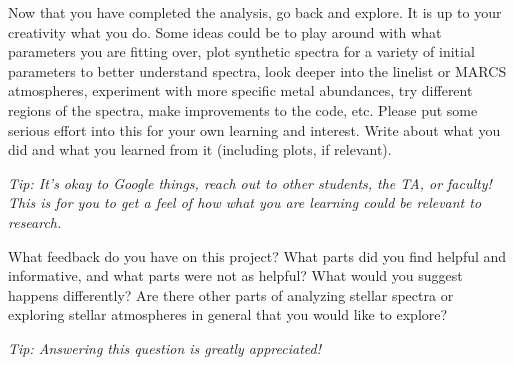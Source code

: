 \documentclass[12pt]{article}
\newenvironment{question}[1]
  {\par\noindent\textbf{#1}\par\vspace{0.5em}}
  {\vspace{1em}}
\newenvironment{answer}
  {\par\noindent\par\vspace{0.5em}\noindent\ignorespaces}
  {\vspace{1em}}
\begin{document}
\begin{question}{}
    Now that you have completed the analysis, go back and explore. It is up to your creativity what you do. Some ideas could be to play around with what parameters you are fitting over, plot synthetic spectra for a variety of initial parameters to better understand spectra, look deeper into the linelist or MARCS atmospheres, experiment with more specific metal abundances, try different regions of the spectra, make improvements to the code, etc. Please put some serious effort into this for your own learning and interest. Write about what you did and what you learned from it (including plots, if relevant).

    \textit{Tip: It's okay to Google things, reach out to other students, the TA, or faculty! This is for you to get a feel of how what you are learning could be relevant to research.}
\end{question}

\begin{answer}
\end{answer}

\vspace{10em}

\begin{question}{}
    What feedback do you have on this project? What parts did you find helpful and informative, and what parts were not as helpful? What would you suggest happens differently? Are there other parts of analyzing stellar spectra or exploring stellar atmospheres in general that you would like to explore?

    \textit{Tip: Answering this question is greatly appreciated!}
\end{question}

\begin{answer}
\end{answer}
\end{document}
